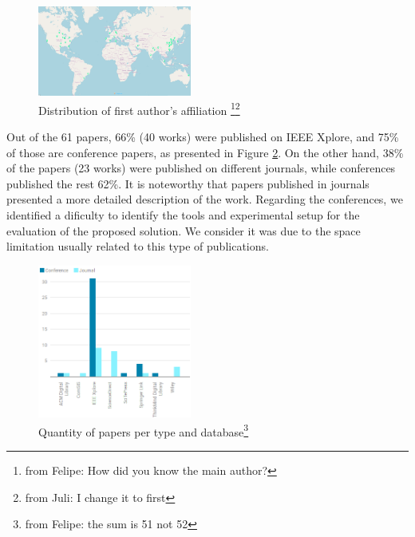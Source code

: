 \documentclass{IEEEtran}
\newcommand\dia[1]{{\color{blue}\footnote{\color{blue}from Felipe: #1}}}
\newcommand\juli[1]{{\color{magenta}\footnote{\color{magenta}from Juli: #1}}}
\begin{document}
\begin{figure}
    \centering
     \includegraphics[width=0.45\textwidth]{Pictures/locations10dic2018.png}
    \caption{Distribution of first author's affiliation \dia{How did you know the main author?}\juli{I change it to first}}
    \label{fig:location}
\end{figure}




Out of the 61 papers, 66\% (40 works) were published on IEEE Xplore, and 75\% of those are conference papers, as presented in Figure \ref{fig:typevenue}. On the other hand, 38\% of the papers (23 works) were published on different journals, while conferences published the rest 62\%. It is noteworthy that papers published in journals presented a more detailed description of the work. Regarding the conferences, we identified a dificulty to identify the tools and experimental setup for the evaluation of the proposed solution. We consider it was due to the space limitation usually related to this type of publications.


\begin{figure}
    \centering
    \includegraphics[width=0.45\textwidth]{Pictures/venuesvstype.png}
    \caption{Quantity of papers per type and database\dia{the sum is 51 not 52}}
    \label{fig:typevenue}
\end{figure}
\end{document}
